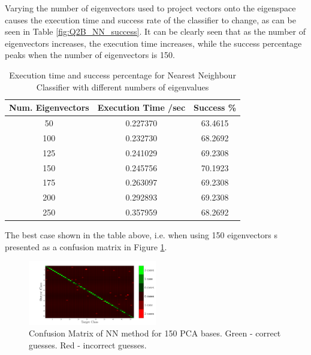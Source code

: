\documentclass[10pt,twocolumn,letterpaper]{article}
\begin{document}
Varying the number of eigenvectors used to project vectors onto the eigenspace causes the execution time and success rate of the classifier to change, as can be seen in Table  \ref{fig:Q2B_NN_success}. It can be clearly seen that as the number of eigenvectors increases, the execution time increases, while the success percentage peaks when the number of eigenvectors is 150.

\begin{table}[H]
\begin{center}
\small
\begin{tabular}{||c c c||}
\hline
\bf Num. Eigenvectors & \bf Execution Time /sec & \bf Success \%\\ [0.5ex]
\hline \hline
50 & 0.227370 & 63.4615 \\ [0.5ex]
\hline
100 & 0.232730 & 68.2692 \\ [0.5ex]
\hline
125 & 0.241029 & 69.2308 \\ [0.5ex]
\hline
150 & 0.245756 & 70.1923 \\ [0.5ex]
\hline
175 & 0.263097 & 69.2308 \\ [0.5ex]
\hline
200 & 0.292893 & 69.2308 \\ [0.5ex]
\hline
250 & 0.357959 & 68.2692 \\ [0.5ex]
\hline
\end{tabular}
\end{center}
\caption{Execution time and success percentage for Nearest Neighbour Classifier with different numbers of eigenvalues} \label{tab:NN_table}
\end{table}

The best case shown in the table above, i.e. when using 150 eigenvectors s presented as a confusion matrix in Figure \ref{fig:confNN}.

\begin{figure}[H]
\begin{center}
  
    \includegraphics[width=0.5\textwidth]{../results/Q2B_NN_confusion}

  \caption{Confusion Matrix of NN method for 150 PCA bases. Green - correct guesses. Red - incorrect guesses. \label{fig:confNN}}

\end{center}
\end{figure}
\end{document}
